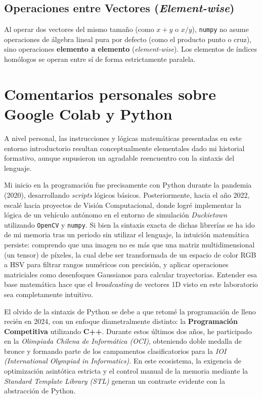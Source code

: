 \documentclass[11pt]{article}
\begin{document}
\subsection*{Operaciones entre Vectores (\textit{Element-wise})}
Al operar dos vectores del mismo tamaño (como $x + y$ o $x / y$), \texttt{numpy} no asume operaciones de álgebra lineal pura por defecto (como el producto punto o cruz), sino operaciones \textbf{elemento a elemento} (\textit{element-wise}). Los elementos de índices homólogos se operan entre sí de forma estrictamente paralela.

\section{Comentarios personales sobre Google Colab y Python}

A nivel personal, las instrucciones y lógicas matemáticas presentadas en este entorno introductorio resultan conceptualmente elementales dado mi historial formativo, aunque supusieron un agradable reencuentro con la sintaxis del lenguaje.

Mi inicio en la programación fue precisamente con Python durante la pandemia (2020), desarrollando \textit{scripts} lógicos básicos. Posteriormente, hacia el año 2022, escalé hacia proyectos de Visión Computacional, donde logré implementar la lógica de un vehículo autónomo en el entorno de simulación \textit{Duckietown} utilizando \texttt{OpenCV} y \texttt{numpy}. Si bien la sintaxis exacta de dichas librerías se ha ido de mi memoria tras un periodo sin utilizar el lenguaje, la intuición matemática persiste: comprendo que una imagen no es más que una matriz multidimensional (un tensor) de píxeles, la cual debe ser transformada de un espacio de color RGB a HSV para filtrar rangos numéricos con precisión, y aplicar operaciones matriciales como desenfoques Gaussianos para calcular trayectorias. Entender esa base matemática hace que el \textit{broadcasting} de vectores 1D visto en este laboratorio sea completamente intuitivo.

El olvido de la sintaxis de Python se debe a que retomé la programación de lleno recién en 2024, con un enfoque diametralmente distinto: la \textbf{Programación Competitiva} utilizando \textbf{C++}. Durante estos últimos dos años, he participado en la \textit{Olimpiada Chilena de Informática (OCI)}, obteniendo doble medalla de bronce y formando parte de los campamentos clasificatorios para la \textit{IOI (International Olympiad in Informatics)}. En este ecosistema, la exigencia de optimización asintótica estricta y el control manual de la memoria mediante la \textit{Standard Template Library (STL)} generan un contraste evidente con la abstracción de Python.
\end{document}
